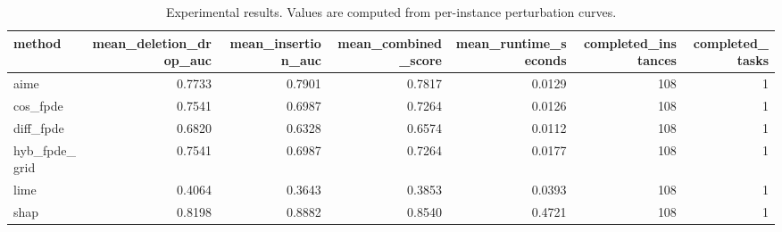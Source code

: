 \begin{table}[t]
\caption{Experimental results. Values are computed from per-instance perturbation curves.}
\label{tab:main_results_computed}
\centering
\begin{tabular}{lrrrrrr}
\toprule
method & mean\_deletion\_drop\_auc & mean\_insertion\_auc & mean\_combined\_score & mean\_runtime\_seconds & completed\_instances & completed\_tasks \\
\midrule
aime & 0.7733 & 0.7901 & 0.7817 & 0.0129 & 108 & 1 \\
cos\_fpde & 0.7541 & 0.6987 & 0.7264 & 0.0126 & 108 & 1 \\
diff\_fpde & 0.6820 & 0.6328 & 0.6574 & 0.0112 & 108 & 1 \\
hyb\_fpde\_grid & 0.7541 & 0.6987 & 0.7264 & 0.0177 & 108 & 1 \\
lime & 0.4064 & 0.3643 & 0.3853 & 0.0393 & 108 & 1 \\
shap & 0.8198 & 0.8882 & 0.8540 & 0.4721 & 108 & 1 \\
\bottomrule
\end{tabular}

\end{table}
